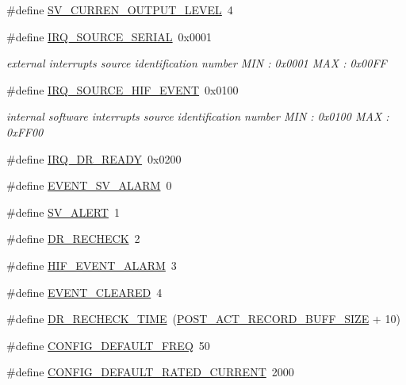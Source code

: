 \begin{DoxyCompactItemize}
\#define \hyperlink{a00021_a648a6327bd26d3d2f537bbea230c6ffb}{S\+V\+\_\+\+C\+U\+R\+R\+E\+N\+\_\+\+O\+U\+T\+P\+U\+T\+\_\+\+L\+E\+V\+E\+L}~4
\item 
\#define \hyperlink{a00021_a286de80383de54438b3e38d9f149dfd0}{I\+R\+Q\+\_\+\+S\+O\+U\+R\+C\+E\+\_\+\+S\+E\+R\+I\+A\+L}~0x0001
\begin{DoxyCompactList}\small\item\em external interrupts source identification number M\+I\+N \+: 0x0001 M\+A\+X \+: 0x00\+F\+F \end{DoxyCompactList}\item 
\#define \hyperlink{a00021_a51725fc3a4c26625f15db1274791d961}{I\+R\+Q\+\_\+\+S\+O\+U\+R\+C\+E\+\_\+\+H\+I\+F\+\_\+\+E\+V\+E\+N\+T}~0x0100
\begin{DoxyCompactList}\small\item\em internal software interrupts source identification number M\+I\+N \+: 0x0100 M\+A\+X \+: 0x\+F\+F00 \end{DoxyCompactList}\item 
\#define \hyperlink{a00021_acfd80444497090bce928df199247a0ec}{I\+R\+Q\+\_\+\+D\+R\+\_\+\+R\+E\+A\+D\+Y}~0x0200
\item 
\#define \hyperlink{a00021_a0cec8cae6d70499e62b4251e5843497d}{E\+V\+E\+N\+T\+\_\+\+S\+V\+\_\+\+A\+L\+A\+R\+M}~0
\item 
\#define \hyperlink{a00021_af66e399e9c5b681f0c1468708a6c9d38}{S\+V\+\_\+\+A\+L\+E\+R\+T}~1
\item 
\#define \hyperlink{a00021_a6e67f9a00e51668436c0395616f43e88}{D\+R\+\_\+\+R\+E\+C\+H\+E\+C\+K}~2
\item 
\#define \hyperlink{a00021_aab5d5969b3cff6fd6cd4a7e2cbbc139d}{H\+I\+F\+\_\+\+E\+V\+E\+N\+T\+\_\+\+A\+L\+A\+R\+M}~3
\item 
\#define \hyperlink{a00021_a602c125746b241f3a37e9fd5f43412b0}{E\+V\+E\+N\+T\+\_\+\+C\+L\+E\+A\+R\+E\+D}~4
\item 
\#define \hyperlink{a00021_afb154043998a164232751d1c030e8650}{D\+R\+\_\+\+R\+E\+C\+H\+E\+C\+K\+\_\+\+T\+I\+M\+E}~(\hyperlink{a00022_ab1ad440de86fff80e517ad748de2ee39}{P\+O\+S\+T\+\_\+\+A\+C\+T\+\_\+\+R\+E\+C\+O\+R\+D\+\_\+\+B\+U\+F\+F\+\_\+\+S\+I\+Z\+E} + 10)
\item 
\#define \hyperlink{a00021_a985a153b3edd3d7d638137ae0b9e5e67}{C\+O\+N\+F\+I\+G\+\_\+\+D\+E\+F\+A\+U\+L\+T\+\_\+\+F\+R\+E\+Q}~50
\item 
\#define \hyperlink{a00021_ae329eb408f386777cbb443c27ca7c1c5}{C\+O\+N\+F\+I\+G\+\_\+\+D\+E\+F\+A\+U\+L\+T\+\_\+\+R\+A\+T\+E\+D\+\_\+\+C\+U\+R\+R\+E\+N\+T}~2000

\end{DoxyCompactItemize}

